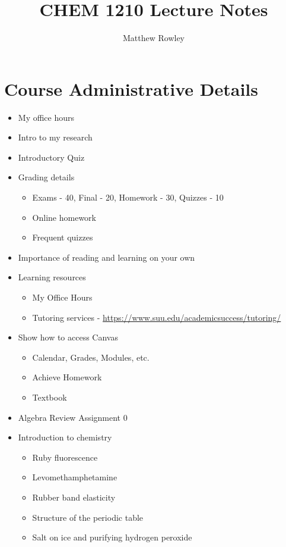 \documentclass[12pt, openany, letterpaper]{memoir}
\begin{document}
\title{CHEM 1210 Lecture Notes}
\author{Matthew Rowley}
\mainmatter
\maketitle
\chapter*{Course Administrative Details}
\begin{itemize}
	\item My office hours
	\item Intro to my research
	\item Introductory Quiz
	\item Grading details
	      \begin{itemize}
		      \item Exams - 40, Final - 20, Homework - 30, Quizzes - 10
		      \item Online homework
		      \item Frequent quizzes
	      \end{itemize}
	\item Importance of reading and learning on your own
	\item Learning resources
	      \begin{itemize}
		      \item My Office Hours
		      \item Tutoring services - \href{https://www.suu.edu/academicsuccess/tutoring/}{https://www.suu.edu/academicsuccess/tutoring/}
	      \end{itemize}
	\item Show how to access Canvas
	      \begin{itemize}
		      \item Calendar, Grades, Modules, etc.
		      \item Achieve Homework
		      \item Textbook
	      \end{itemize}
	\item Algebra Review Assignment 0
	\item Introduction to chemistry
	      \begin{itemize}
		      \item Ruby fluorescence
		      \item Levomethamphetamine
		      \item Rubber band elasticity
		      \item Structure of the periodic table
		      \item Salt on ice and purifying hydrogen peroxide
	      \end{itemize}
\end{itemize}
\end{document}
